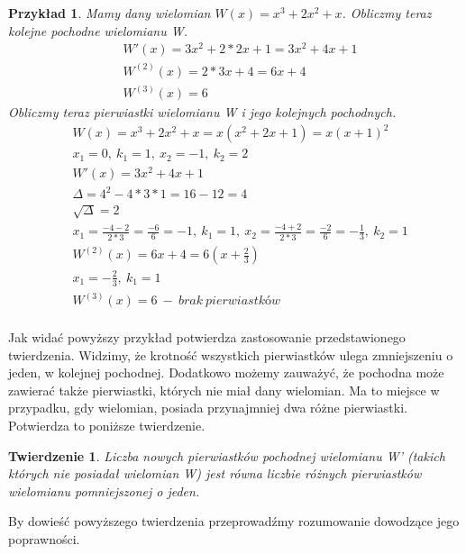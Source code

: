 \documentclass[twoside,a4paper]{book}
\newtheorem{theorem}{Twierdzenie}
\newtheorem{example}{Przykład}
\begin{document}
\begin{example}
	Mamy dany wielomian $W(x) = x^3 + 2x^2 + x$. Obliczmy teraz kolejne pochodne wielomianu W.
	\begin{equation}
	\begin{split}
	&W'(x) = 3x^2 + 2*2x + 1 = 3x^2 + 4x + 1 \\
	&W^{(2)}(x) = 2*3x + 4 = 6x + 4 \\
	&W^{(3)}(x) = 6
	\end{split}
	\end{equation}
	Obliczmy teraz pierwiastki wielomianu W i jego kolejnych pochodnych.
	\begin{equation}
	\begin{split}
	&W(x) = x^3 + 2x^2 + x = x(x^2 + 2x +1) = x(x + 1)^2 \\
	&x_1 = 0,\ k_1 = 1,\ x_2 = -1,\ k_2 = 2 \\
	&W'(x) = 3x^2 + 4x + 1 \\
	&\Delta = 4^2 - 4*3*1 = 16 - 12 = 4 \\
	&\sqrt{\Delta} = 2 \\
	&x_1 = \frac{-4-2}{2*3} = \frac{-6}{6} = -1,\ k_1 = 1,\ x_2 = \frac{-4+2}{2*3} = \frac{-2}{6} = -\frac{1}{3},\ k_2 = 1 \\
	&W^{(2)}(x) = 6x + 4 = 6 (x + \frac{2}{3}) \\
	&x_1 = -\frac{2}{3},\ k_1 = 1 \\
	&W^{(3)}(x) = 6\ -\ brak\ pierwiastków \\
	\end{split}
	\end{equation}
\end{example}

Jak widać powyższy przykład potwierdza zastosowanie przedstawionego twierdzenia. Widzimy, że krotność wszystkich pierwiastków ulega zmniejszeniu o jeden, w kolejnej pochodnej. Dodatkowo możemy zauważyć, że pochodna może zawierać także pierwiastki, których nie miał dany wielomian. Ma to miejsce w przypadku, gdy wielomian, posiada przynajmniej dwa różne pierwiastki. Potwierdza to poniższe twierdzenie.

\begin{theorem}
	Liczba nowych pierwiastków pochodnej wielomianu W' (takich których nie posiadał wielomian W) jest równa liczbie różnych pierwiastków wielomianu pomniejszonej o jeden.
\end{theorem}

By dowieść powyższego twierdzenia przeprowadźmy rozumowanie dowodzące jego poprawności.
\end{document}

